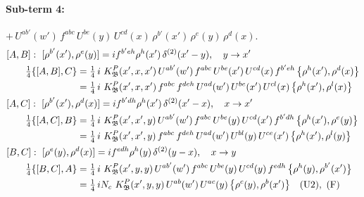 \documentclass[10pt]{article}
\numberwithin{equation}{section}
\begin{document}
\paragraph{Sub-term 4:} $+\,U^{ab'}(w')\,f^{abc}\,U^{be}(y)\,U^{cd}(x)\,\rho^{b'}(x')\,\rho^{e}(y)\,\rho^{d}(x)$.
\begin{align}
&[A,B]:\ [\rho^{b'}(x'),\rho^{e}(y)]=i f^{b'eh}\rho^{h}(x')\,\delta^{(2)}(x'-y),\quad y\to x'\notag\\
&\qquad \tfrac14\{[A,B],C\}=\tfrac14\,i\,\,K^{P}_{\mathfrak B}(x',x,x')\,U^{ab'}(w')\,f^{abc}\,U^{be}(x')\,U^{cd}(x)\,f^{b'eh}\,\big\{\rho^{h}(x'),\rho^{d}(x)\big\}\notag\\
&\qquad\phantom{\tfrac14\{[A,B],C\}}=\tfrac14\,i\,\,K^{P}_{\mathfrak B}(x',x,x')\,f^{abc}\,f^{deh}\,U^{ad}(w')\,U^{be}(x')\,U^{cl}(x)\,\big\{\rho^{h}(x'),\rho^{l}(x)\big\}
\label{B:eq:GI.IV.P-4-AB}\\
&[A,C]:\ [\rho^{b'}(x'),\rho^{d}(x)]=i f^{b'dh}\rho^{h}(x')\,\delta^{(2)}(x'-x),\quad x\to x'\notag\\
&\qquad \tfrac14\{[A,C],B\}=\tfrac14\,i\,\,K^{P}_{\mathfrak B}(x',x',y)\,U^{ab'}(w')\,f^{abc}\,U^{be}(y)\,U^{cd}(x')\,f^{b'dh}\,\big\{\rho^{h}(x'),\rho^{e}(y)\big\}\notag\\
&\qquad\phantom{\tfrac14\{[A,C],B\}}=\tfrac14\,i\,\,K^{P}_{\mathfrak B}(x',x',y)\,f^{abc}\,f^{deh}\,U^{ad}(w')\,U^{bl}(y)\,U^{ce}(x')\,\big\{\rho^{h}(x'),\rho^{l}(y)\big\}
\label{B:eq:GI.IV.P-4-AC}\\
&[B,C]:\ [\rho^{e}(y),\rho^{d}(x)]=i f^{edh}\rho^{h}(y)\,\delta^{(2)}(y-x),\quad x\to y\notag\\
&\qquad \tfrac14\{[B,C],A\}=\tfrac14\,i\,\,K^{P}_{\mathfrak B}(x',y,y)\,U^{ab'}(w')\,f^{abc}\,U^{be}(y)\,U^{cd}(y)\,f^{edh}\,\big\{\rho^{h}(y),\rho^{b'}(x')\big\}\notag\\
&\qquad\phantom{\tfrac14\{[B,C],A\}}=\tfrac14\,i N_{c}\,\,K^{P}_{\mathfrak B}(x',y,y)\,U^{ab}(w')\,U^{ac}(y)\,\big\{\rho^{c}(y),\rho^{b}(x')\big\}\quad\text{(U2)},\ \text{(F)}
\label{B:eq:GI.IV.P-4-BC}
\end{align}
\end{document}
